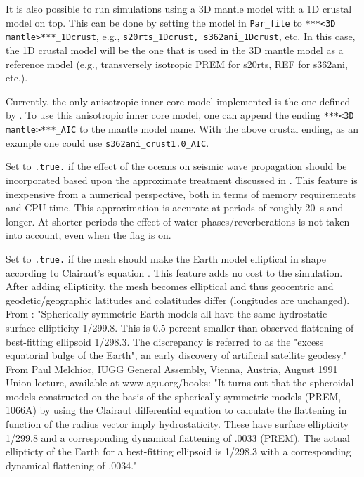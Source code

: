 \begin{description}
It is also possible to run simulations using a 3D mantle model with a 1D crustal model on top. This can be done by setting the model in \texttt{Par\_file} to \texttt{***<3D mantle>***\_1Dcrust}, e.g., \texttt{s20rts\_1Dcrust, s362ani\_1Dcrust}, etc. In this case, the 1D crustal model will be the one that is used in the 3D mantle model as a reference model (e.g., transversely isotropic PREM for s20rts, REF for s362ani, etc.).

Currently, the only anisotropic inner core model implemented is the one defined by \citet{Ishii2002}. To use this anisotropic inner core model, one can append the ending \texttt{***<3D mantle>***\_AIC} to the mantle model name. With the above crustal ending, as an example one could use \texttt{s362ani\_crust1.0\_AIC}.
%
\item [{\texttt{OCEANS}}] Set to \texttt{.true.} if the effect of the oceans
on seismic wave propagation should be incorporated based upon the
approximate treatment discussed in \citet{KoTr02b}. This feature
is inexpensive from a numerical perspective, both in terms of memory
requirements and CPU time. This approximation is accurate at periods
of roughly 20~s and longer. At shorter periods the effect of water
phases/reverberations is not taken into account, even when the flag
is on.
%
\item [{\texttt{ELLIPTICITY}}] Set to \texttt{.true.} if the mesh should
make the Earth model elliptical in shape according to Clairaut's equation
\citep{DaTr98}. This feature adds no cost to the simulation.
After adding ellipticity, the mesh becomes elliptical and thus geocentric and geodetic/geographic latitudes and colatitudes differ (longitudes are unchanged).
%
From \cite{DaTr98}: "Spherically-symmetric Earth models all have the same hydrostatic surface ellipticity 1/299.8. This is 0.5 percent smaller than observed flattening of best-fitting ellipsoid 1/298.3. The discrepancy is referred to as the "excess equatorial bulge of the Earth", an early discovery of artificial satellite geodesy."
%
From Paul Melchior, IUGG General Assembly, Vienna, Austria, August 1991 Union lecture, available at www.agu.org/books: "It turns out that the spheroidal models constructed on the basis of the spherically-symmetric models (PREM, 1066A) by using the Clairaut differential equation to calculate the flattening
in function of the radius vector imply hydrostaticity. These have surface ellipticity 1/299.8 and
a corresponding dynamical flattening of .0033 (PREM). The actual ellipticty of the Earth for a best-fitting ellipsoid is 1/298.3 with a corresponding dynamical flattening of .0034."


\end{description}
